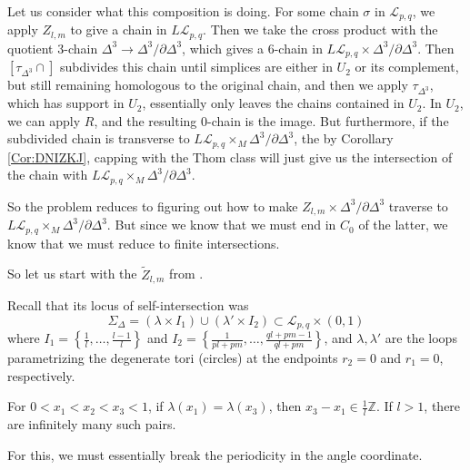 \documentclass[reqno]{amsart}
\theoremstyle{definition}
\theoremstyle{remark}
\begin{document}
    Let us consider what this composition is doing.
    For some chain $\sigma$ in $\mathcal{L}_{p,q}$,
    we apply $Z_{l,m}$ to give a chain
    in $L \mathcal{L}_{p,q}$.
    Then we take the cross product with
    the quotient $3$-chain $\Delta^3 \to \Delta^3 / \partial \Delta^3$,
    which gives a $6$-chain in
    $L \mathcal{L}_{p,q} \times \Delta^3 / \partial \Delta^3$.
    Then $\left[ \tau_{\Delta^3} \cap \right] $ subdivides
    this chain until simplices
    are either in
    $U_2$ or its complement, but still remaining homologous
    to the original chain, and then we apply
    $\tau_{\Delta^3}$, which has support in $U_2$,
    essentially only leaves the chains contained in $U_2$.
     In $U_2$, we can apply
    $R$, and the resulting $0$-chain is the image.
    But furthermore, if
    the subdivided chain is transverse
    to $L \mathcal{L}_{p,q} \times_M \Delta^3 / \partial \Delta^3$, the by
    Corollary \ref{Cor:DNIZKJ}, capping with the Thom
    class will just give us the intersection of the chain with
    $L \mathcal{L}_{p,q} \times_M \Delta^3 / \partial \Delta^3$.

    So the problem reduces to 
    figuring out how to make $Z_{l,m} \times \Delta^3 / \partial \Delta^3$ 
    traverse to $L \mathcal{L}_{p,q} \times_M \Delta^3 / \partial \Delta^3$.
    But since we know that
    we must end in $C_0$ of the latter, we know that we must reduce
    to finite intersections.

    So let us start with the $\tilde{Z}_{l,m}$ from \cite{Naef-Rivera-Wahl}.

    Recall that its locus of self-intersection was
    \[
    \Sigma_{\Delta} = \left( \lambda \times I_1 \right) \cup 
    \left( \lambda' \times I_2 \right) \subset 
    \mathcal{L}_{p,q} \times (0,1)
    \] 
    where
    $I_1 = \left\{ \frac{1}{l},\ldots, \frac{l-1}{l} \right\} $ and
    $I_2 = \left\{ \frac{1}{pl+pm}, \ldots,
    \frac{ql+pm-1}{ql+pm}\right\} $, and
    $\lambda, \lambda'$ are the loops parametrizing the
    degenerate tori (circles) at the endpoints
    $r_2 = 0$ and $r_1 = 0$, respectively.
    

    For $0 < x_1 < x_2 < x_3 < 1$, if
    $\lambda(x_1 ) = \lambda(x_3)$, then
    $x_3 - x_1  \in  \frac{1}{l} \mathbb{Z}$.
    If $l>1$, there are infinitely many such pairs.
    
    For this, we must essentially break the periodicity in
    the angle coordinate.
\end{document}

